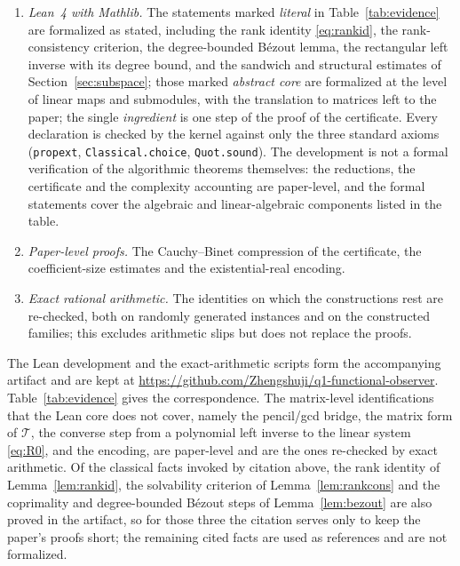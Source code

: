 \documentclass[journal]{IEEEtran}
\theoremstyle{plainn}
\theoremstyle{remark}
\begin{document}
\begin{enumerate}
\item \emph{Lean~4 with Mathlib.} The statements marked \emph{literal} in
Table~\ref{tab:evidence} are formalized as stated, including the rank identity
\eqref{eq:rankid}, the rank-consistency criterion, the degree-bounded B\'ezout lemma, the
rectangular left inverse with its degree bound, and the sandwich and structural estimates of
Section~\ref{sec:subspace}; those marked \emph{abstract core} are formalized at the level of
linear maps and submodules, with the translation to matrices left to the paper; the single
\emph{ingredient} is one step of the proof of the certificate. Every declaration is checked by the
kernel against only the three standard axioms (\texttt{propext}, \texttt{Classical.choice},
\texttt{Quot.sound}). The development is not a formal verification of the algorithmic theorems
themselves: the reductions, the certificate and the complexity accounting are paper-level, and the
formal statements cover the algebraic and linear-algebraic components listed in the table.
\item \emph{Paper-level proofs.} The Cauchy--Binet compression of the certificate, the coefficient-size estimates and the existential-real encoding.
\item \emph{Exact rational arithmetic.} The identities on which the constructions rest are re-checked, both on randomly generated instances and on the constructed families; this excludes arithmetic slips but does not replace the proofs.
\end{enumerate}

The Lean development and the exact-arithmetic scripts form the accompanying artifact and are kept at \url{https://github.com/Zhengshuji/q1-functional-observer}. Table~\ref{tab:evidence} gives the correspondence. The matrix-level identifications that the Lean core does not cover, namely the pencil/gcd bridge, the matrix form of $\mathcal T$, the converse step from a polynomial left inverse to the linear system \eqref{eq:R0}, and the encoding, are paper-level and are the ones re-checked by exact arithmetic. Of the classical facts invoked by citation above, the rank identity of Lemma~\ref{lem:rankid}, the solvability criterion of Lemma~\ref{lem:rankcons} and the coprimality and degree-bounded B\'ezout steps of Lemma~\ref{lem:bezout} are also proved in the artifact, so for those three the citation serves only to keep the paper's proofs short; the remaining cited facts are used as references and are not formalized.
\end{document}
